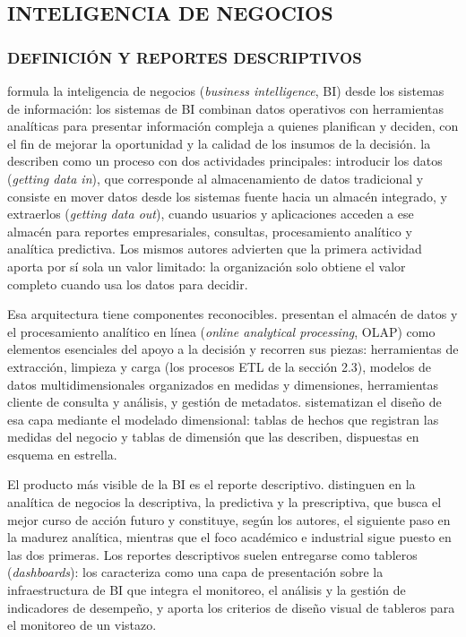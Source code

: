 \subsection{INTELIGENCIA DE NEGOCIOS}
\subsubsection{DEFINICIÓN Y REPORTES DESCRIPTIVOS}

\textcite{Negash2004} formula la inteligencia de negocios (\textit{business intelligence}, BI) desde los sistemas de información: los sistemas de BI combinan datos operativos con herramientas analíticas para presentar información compleja a quienes planifican y deciden, con el fin de mejorar la oportunidad y la calidad de los insumos de la decisión. \textcite{Watson2007} la describen como un proceso con dos actividades principales: introducir los datos (\textit{getting data in}), que corresponde al almacenamiento de datos tradicional y consiste en mover datos desde los sistemas fuente hacia un almacén integrado, y extraerlos (\textit{getting data out}), cuando usuarios y aplicaciones acceden a ese almacén para reportes empresariales, consultas, procesamiento analítico y analítica predictiva. Los mismos autores advierten que la primera actividad aporta por sí sola un valor limitado: la organización solo obtiene el valor completo cuando usa los datos para decidir.

Esa arquitectura tiene componentes reconocibles. \textcite{Chaudhuri1997} presentan el almacén de datos y el procesamiento analítico en línea (\textit{online analytical processing}, OLAP) como elementos esenciales del apoyo a la decisión y recorren sus piezas: herramientas de extracción, limpieza y carga (los procesos ETL de la sección 2.3), modelos de datos multidimensionales organizados en medidas y dimensiones, herramientas cliente de consulta y análisis, y gestión de metadatos. \textcite{Kimball2013} sistematizan el diseño de esa capa mediante el modelado dimensional: tablas de hechos que registran las medidas del negocio y tablas de dimensión que las describen, dispuestas en esquema en estrella.

El producto más visible de la BI es el reporte descriptivo. \textcite{Lepenioti2020} distinguen en la analítica de negocios la descriptiva, la predictiva y la prescriptiva, que busca el mejor curso de acción futuro y constituye, según los autores, el siguiente paso en la madurez analítica, mientras que el foco académico e industrial sigue puesto en las dos primeras. Los reportes descriptivos suelen entregarse como tableros (\textit{dashboards}): \textcite{Eckerson2010} los caracteriza como una capa de presentación sobre la infraestructura de BI que integra el monitoreo, el análisis y la gestión de indicadores de desempeño, y \textcite{Few2013} aporta los criterios de diseño visual de tableros para el monitoreo de un vistazo.

